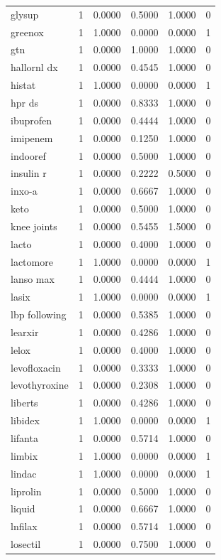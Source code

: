 \begin{longtable}{p{3.0cm}rrrrr}
glysup & 1 & 0.0000 & 0.5000 & 1.0000 & 0 \\
greenox & 1 & 1.0000 & 0.0000 & 0.0000 & 1 \\
gtn & 1 & 0.0000 & 1.0000 & 1.0000 & 0 \\
hallornl dx & 1 & 0.0000 & 0.4545 & 1.0000 & 0 \\
histat & 1 & 1.0000 & 0.0000 & 0.0000 & 1 \\
hpr ds & 1 & 0.0000 & 0.8333 & 1.0000 & 0 \\
ibuprofen & 1 & 0.0000 & 0.4444 & 1.0000 & 0 \\
imipenem & 1 & 0.0000 & 0.1250 & 1.0000 & 0 \\
indooref & 1 & 0.0000 & 0.5000 & 1.0000 & 0 \\
insulin r & 1 & 0.0000 & 0.2222 & 0.5000 & 0 \\
inxo-a & 1 & 0.0000 & 0.6667 & 1.0000 & 0 \\
keto & 1 & 0.0000 & 0.5000 & 1.0000 & 0 \\
knee joints & 1 & 0.0000 & 0.5455 & 1.5000 & 0 \\
lacto & 1 & 0.0000 & 0.4000 & 1.0000 & 0 \\
lactomore & 1 & 1.0000 & 0.0000 & 0.0000 & 1 \\
lanso max & 1 & 0.0000 & 0.4444 & 1.0000 & 0 \\
lasix & 1 & 1.0000 & 0.0000 & 0.0000 & 1 \\
lbp following & 1 & 0.0000 & 0.5385 & 1.0000 & 0 \\
learxir & 1 & 0.0000 & 0.4286 & 1.0000 & 0 \\
lelox & 1 & 0.0000 & 0.4000 & 1.0000 & 0 \\
levofloxacin & 1 & 0.0000 & 0.3333 & 1.0000 & 0 \\
levothyroxine & 1 & 0.0000 & 0.2308 & 1.0000 & 0 \\
liberts & 1 & 0.0000 & 0.4286 & 1.0000 & 0 \\
libidex & 1 & 1.0000 & 0.0000 & 0.0000 & 1 \\
lifanta & 1 & 0.0000 & 0.5714 & 1.0000 & 0 \\
limbix & 1 & 1.0000 & 0.0000 & 0.0000 & 1 \\
lindac & 1 & 1.0000 & 0.0000 & 0.0000 & 1 \\
liprolin & 1 & 0.0000 & 0.5000 & 1.0000 & 0 \\
liquid & 1 & 0.0000 & 0.6667 & 1.0000 & 0 \\
lnfilax & 1 & 0.0000 & 0.5714 & 1.0000 & 0 \\
losectil & 1 & 0.0000 & 0.7500 & 1.0000 & 0 \\

\end{longtable}
